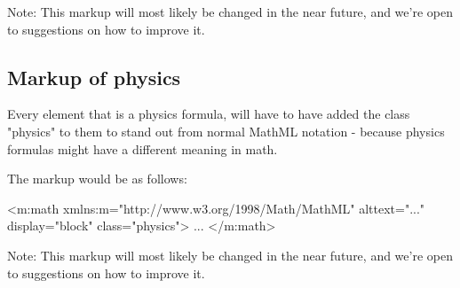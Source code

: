 \documentclass[english,a4paper,11pt]{article}
\begin{document}
\begin{eksempler}
Note: This markup will most likely be changed in the near future, and we're open to suggestions on how to improve it.

\subsection{Markup of physics}

Every  element that is a physics formula, will have to have added the class "physics" to them to stand out from normal MathML notation - because physics formulas might have a different meaning in math.

\begin{eksempler}
The markup would be as follows:
\begin{kodeblokk}
\begin{verbatimtab}[3]
	<m:math 
	    xmlns:m="http://www.w3.org/1998/Math/MathML"
	    alttext="..."
	    display="block"
		class="physics">
		...
	</m:math>
\end{verbatimtab}
\end{kodeblokk}
\end{eksempler}

Note: This markup will most likely be changed in the near future, and we're open to suggestions on how to improve it.

\end{eksempler}
\end{document}
